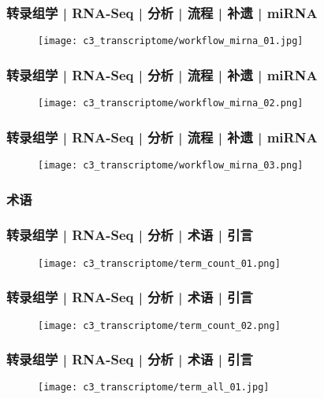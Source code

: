 \begin{frame}
  \frametitle{转录组学 | RNA-Seq | 分析 | 流程 | 补遗 | miRNA}
  \begin{figure}
    \centering
    \texttt{[image: c3\_transcriptome/workflow\_mirna\_01.jpg]}
  \end{figure}
\end{frame}

\begin{frame}
  \frametitle{转录组学 | RNA-Seq | 分析 | 流程 | 补遗 | miRNA}
  \begin{figure}
    \centering
    \texttt{[image: c3\_transcriptome/workflow\_mirna\_02.png]}
  \end{figure}
\end{frame}

\begin{frame}
  \frametitle{转录组学 | RNA-Seq | 分析 | 流程 | 补遗 | miRNA}
  \begin{figure}
    \centering
    \texttt{[image: c3\_transcriptome/workflow\_mirna\_03.png]}
  \end{figure}
\end{frame}

\subsubsection{术语}
\begin{frame}
  \frametitle{转录组学 | RNA-Seq | 分析 | 术语 | 引言}
  \begin{figure}
    \centering
    \texttt{[image: c3\_transcriptome/term\_count\_01.png]}
  \end{figure}
\end{frame}

\begin{frame}
  \frametitle{转录组学 | RNA-Seq | 分析 | 术语 | 引言}
  \begin{figure}
    \centering
    \texttt{[image: c3\_transcriptome/term\_count\_02.png]}
  \end{figure}
\end{frame}

\begin{frame}
  \frametitle{转录组学 | RNA-Seq | 分析 | 术语 | 引言}
  \begin{figure}
    \centering
    \texttt{[image: c3\_transcriptome/term\_all\_01.jpg]}
  \end{figure}
\end{frame}


